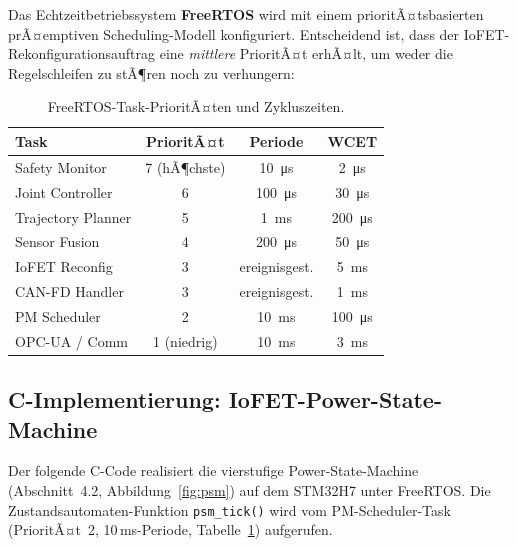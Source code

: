 ﻿\documentclass[a4paper,12pt]{scrreprt}
\theoremstyle{definition}
\begin{document}
Das Echtzeitbetriebssystem \textbf{FreeRTOS} wird mit einem
prioritÃ¤tsbasierten prÃ¤emptiven Scheduling-Modell konfiguriert.
Entscheidend ist, dass der IoFET-Rekonfigurationsauftrag eine
\emph{mittlere} PrioritÃ¤t erhÃ¤lt, um weder die Regelschleifen
zu stÃ¶ren noch zu verhungern:

\begin{table}[H]
\centering
\caption{FreeRTOS-Task-PrioritÃ¤ten und Zykluszeiten.}
\label{tab:freertos}
\small
\begin{tabular}{|l|c|c|c|}
\hline
\rowcolor{mcured!20}
\textbf{Task} & \textbf{PrioritÃ¤t} & \textbf{Periode} & \textbf{WCET} \\
\hline
Safety Monitor & 7 (hÃ¶chste) & \SI{10}{\micro\second} & \SI{2}{\micro\second} \\
\hline
Joint Controller & 6 & \SI{100}{\micro\second} & \SI{30}{\micro\second} \\
\hline
Trajectory Planner & 5 & \SI{1}{\milli\second} & \SI{200}{\micro\second} \\
\hline
Sensor Fusion & 4 & \SI{200}{\micro\second} & \SI{50}{\micro\second} \\
\hline
IoFET Reconfig & 3 & ereignisgest. & \SI{5}{\milli\second} \\
\hline
CAN-FD Handler & 3 & ereignisgest. & \SI{1}{\milli\second} \\
\hline
PM Scheduler & 2 & \SI{10}{\milli\second} & \SI{100}{\micro\second} \\
\hline
OPC-UA / Comm & 1 (niedrig) & \SI{10}{\milli\second} & \SI{3}{\milli\second} \\
\hline
\end{tabular}
\end{table}

\subsection{C-Implementierung: IoFET-Power-State-Machine}

Der folgende C-Code realisiert die vierstufige Power-State-Machine
(Abschnitt~4.2, Abbildung~\ref{fig:psm}) auf dem STM32H7 unter
FreeRTOS. Die Zustandsautomaten-Funktion \texttt{psm\_tick()} wird
vom PM-Scheduler-Task (PrioritÃ¤t~2, 10\,ms-Periode,
Tabelle~\ref{tab:freertos}) aufgerufen.
\end{document}
